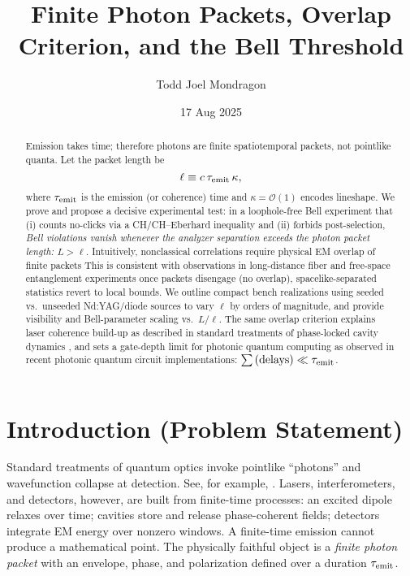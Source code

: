 \documentclass[reprint,aps,prl,nofootinbib,superscriptaddress]{revtex4-2}
\begin{document}
\title{Finite Photon Packets, Overlap Criterion, and the Bell Threshold}

\author{Todd Joel Mondragon} 
\date{17 Aug 2025}

\begin{abstract}
Emission takes time; therefore photons are finite spatiotemporal packets, not pointlike quanta. Let the packet length be
\begin{equation}
\ell \equiv c\,\tau_{\rm emit}\,\kappa,
\end{equation}
where $\tau_{\rm emit}$ is the emission (or coherence) time and $\kappa=\mathcal{O}(1)$ encodes lineshape. We prove and propose a decisive experimental test: in a loophole-free Bell experiment that (i) counts no-clicks via a CH/CH--Eberhard inequality and (ii) forbids post-selection, \emph{Bell violations vanish whenever the analyzer separation exceeds the photon packet length: $L>\ell$}. Intuitively, nonclassical correlations require physical EM overlap of finite packets This is consistent with observations in long-distance fiber and free-space entanglement experiments once packets disengage (no overlap), spacelike-separated statistics revert to local bounds. We outline compact bench realizations using seeded vs.\ unseeded Nd:YAG/diode sources to vary $\ell$ by orders of magnitude, and provide visibility and Bell-parameter scaling vs.\ $L/\ell$. The same overlap criterion explains laser coherence build-up as described in standard treatments of phase-locked cavity dynamics \cite{Siegman1986}, and sets a gate-depth limit for photonic quantum computing as observed in recent photonic quantum circuit implementations: $\sum \text{(delays)} \ll \tau_{\rm emit}$.~~~
\end{abstract}

\vspace{1em}

\maketitle

\section{Introduction (Problem Statement)}
Standard treatments of quantum optics invoke pointlike ``photons'' and wavefunction collapse at detection. See, for example, \cite{Giustina2015,Shalm2015,Hensen2015,Eberhard1993,CHSH1969}. Lasers, interferometers, and detectors, however, are built from finite-time processes: an excited dipole relaxes over time; cavities store and release phase-coherent fields; detectors integrate EM energy over nonzero windows. A finite-time emission cannot produce a mathematical point. The physically faithful object is a \emph{finite photon packet} with an envelope, phase, and polarization defined over a duration $\tau_{\rm emit}$.
\end{document}
